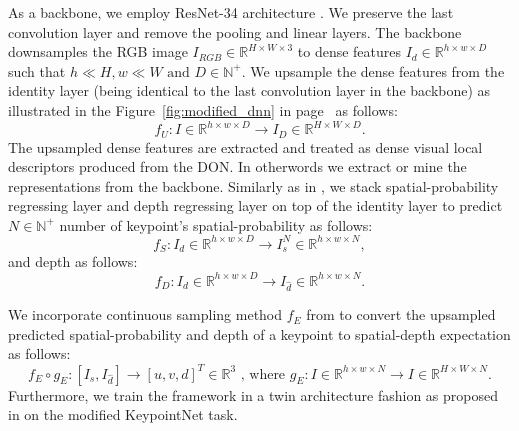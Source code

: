 As a backbone, we employ ResNet-34 architecture \cite{resnet}.
We preserve the last convolution layer and remove the pooling and linear layers. The backbone downsamples the RGB image $I_{RGB} \in \mathbb{R}^{H \times W \times 3}$
to dense features $I_d \in \mathbb{R}^{h \times w \times D}$
such that $ h \ll H, w \ll W \text{ and } D \in \mathbb{N}^+$.
We upsample the dense features from the identity layer
(being identical to the last convolution layer in the backbone) as illustrated in the Figure~\ref{fig:modified_dnn} in page~\pageref{fig:modified_dnn} as follows:
\begin{equation}
    f_U: I \in \mathbb{R}^{h \times w \times D} \rightarrow I_D \in \mathbb{R}^{H \times W \times D}.
\end{equation}
The upsampled dense features are extracted and treated as dense visual local descriptors produced from the DON. In otherwords
we extract or mine the representations from the backbone.
Similarly as in \cite{suwajanakorn2018discovery}, we stack spatial-probability regressing layer and
depth regressing layer on top of the identity layer to predict $N \in \mathbb{N}^+$ number of keypoint's spatial-probability as follows:
\begin{equation}
    f_S: I_d \in \mathbb{R}^{h \times w \times D} \rightarrow I_s^N \in \mathbb{R}^{h \times w \times N},
\end{equation}
and depth as follows:
\begin{equation}
    f_D: I_d \in \mathbb{R}^{h \times w \times D} \rightarrow I_{\hat{d}} \in \mathbb{R}^{h \times w \times N}.
\end{equation}

We incorporate continuous sampling method $f_E$ from \parencites{florence2020dense}{suwajanakorn2018discovery}
to convert the upsampled predicted spatial-probability and depth of a keypoint to spatial-depth expectation as follows:
\begin{equation}
    f_E \circ g_E:[I_s, I_{\hat{d}}] \rightarrow [u, v, d]^T \in \mathbb{R}^3 \text{ , where }  g_E: I \in \mathbb{R}^{h \times w \times N} \rightarrow I \in \mathbb{R}^{H \times W \times N}.
\end{equation}
Furthermore, we train the framework in a twin architecture fashion as proposed in
\parencites{chen2020simple}{zbontar2021barlow}{florence2018dense}{florence2020dense}{kupcsik2021supervised}{adrian2022efficient}{hadjivelichkov2021fully}{nerf-Supervision}
on the modified KeypointNet task.

